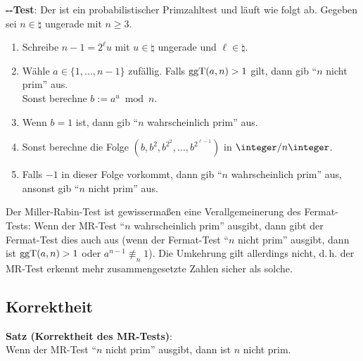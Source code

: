 \textbf{--Test}:
Der  ist ein probabilistischer Primzahltest
und läuft wie folgt ab.
Gegeben sei $n \in \natural$ ungerade mit $n \ge 3$.
\begin{enumerate}
    \item
    Schreibe $n - 1 = 2^\ell u$ mit $u \in \natural$ ungerade und $\ell \in \natural$.
    
    \item
    Wähle $a \in \{1, \dotsc, n - 1\}$ zufällig.
    Falls $\operatorname{ggT}(a, n) > 1$ gilt, dann gib "`$n$ nicht prim"' aus.\\
    Sonst berechne $b := a^u \bmod n$.
    
    \item
    Wenn $b = 1$ ist, dann gib "`$n$ wahrscheinlich prim"' aus.
    
    \item
    Sonst berechne die Folge $(b, b^2, b^{2^2}, \dotsc, b^{2^{\ell-1}})$ in $\ZnZ$.
    
    \item
    Falls $-1$ in dieser Folge vorkommt, dann gib "`$n$ wahrscheinlich prim"' aus,
    ansonst gib "`$n$ nicht prim"' aus.
\end{enumerate}
Der Miller-Rabin-Test ist gewissermaßen eine Verallgemeinerung des Fermat-Tests:
Wenn der MR-Test "`$n$ wahrscheinlich prim"' ausgibt, dann gibt der Fermat-Test dies auch aus
(wenn der Fermat-Test "`$n$ nicht prim"' ausgibt, dann ist $\operatorname{ggT}(a, n) > 1$ oder
$a^{n-1} \not\equiv_n 1$).
Die Umkehrung gilt allerdings nicht,
d.\,h. der MR-Test erkennt mehr zusammengesetzte Zahlen sicher als solche.

\pagebreak

\subsection{%
    Korrektheit%
}

\textbf{Satz (Korrektheit des MR-Tests)}:\\
Wenn der MR-Test "`$n$ nicht prim"' ausgibt, dann ist $n$ nicht prim.

